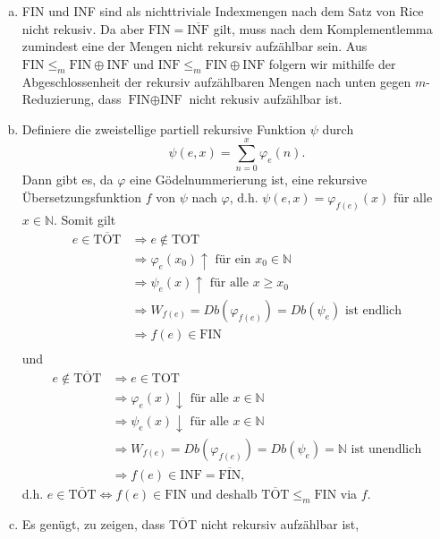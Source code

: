 \documentclass[german,headsepline]{scrartcl}
\theoremstyle{definition}
\begin{document}
	\begin{solution}
		\begin{enumerate}[(a)]
			\item FIN und INF sind als nichttriviale Indexmengen nach dem Satz von Rice nicht rekusiv.
				Da aber $\text{FIN}=\overline{\text{INF}}$ gilt,
				muss nach dem Komplementlemma zumindest eine der Mengen nicht rekursiv aufzählbar sein.
				Aus $\text{FIN}\leq_m\text{FIN}\oplus\text{INF}$ und $\text{INF}\leq_m\text{FIN}\oplus\text{INF}$
				folgern wir mithilfe der Abgeschlossenheit der rekursiv aufzählbaren Mengen nach unten gegen $m$-Reduzierung,
				dass $\text{FIN}\oplus\text{INF}$ nicht rekusiv aufzählbar ist.
			\item Definiere die zweistellige partiell rekursive Funktion $\psi$ durch
				\[\psi(e,x)=\sum_{n=0}^{x}\varphi_e(n).\]
				Dann gibt es, da $\varphi$ eine Gödelnummerierung ist,
				eine rekursive Übersetzungsfunktion $f$ von $\psi$ nach $\varphi$,
				d.h. $\psi(e,x)=\varphi_{f(e)}(x)$ für alle $x\in\mathbb{N}$.
				Somit gilt \begin{align*}
					e\in\overline{\text{TOT}}
					&\Rightarrow e\not\in\text{TOT} \\
					&\Rightarrow\varphi_e(x_0)\uparrow\text{ für ein }x_0\in\mathbb{N} \\
					&\Rightarrow\psi_e(x)\uparrow\text{ für alle }x\geq x_0 \\
					&\Rightarrow W_{f(e)}=Db(\varphi_{f(e)})=Db(\psi_e)\text{ ist endlich} \\
					&\Rightarrow f(e)\in\text{FIN} \\
				\end{align*} und \begin{align*}
					e\not\in\overline{\text{TOT}}
					&\Rightarrow e\in\text{TOT} \\
					&\Rightarrow\varphi_e(x)\downarrow\text{ für alle }x\in\mathbb{N} \\
					&\Rightarrow\psi_e(x)\downarrow\text{ für alle }x\in\mathbb{N} \\
					&\Rightarrow W_{f(e)}=Db(\varphi_{f(e)})=Db(\psi_e)=\mathbb{N} \text{ ist unendlich} \\
					&\Rightarrow f(e)\in\text{INF}=\overline{\text{FIN}},
				\end{align*}
				d.h. $e\in\overline{\text{TOT}}\Leftrightarrow f(e)\in\text{FIN}$
				und deshalb $\overline{\text{TOT}}\leq_m\text{FIN}$ via $f$.
			\item Es genügt, zu zeigen, dass $\overline{\text{TOT}}$ nicht rekursiv aufzählbar ist,

\end{enumerate}
\end{solution}
\end{document}
